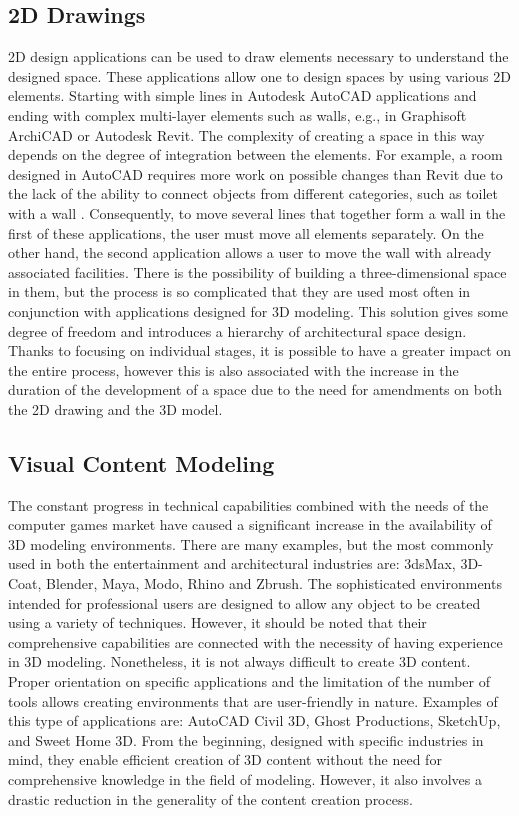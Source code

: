 \documentclass[runningheads]{llncs}
\begin{document}
\subsection{2D Drawings}
2D design applications can be used to draw elements necessary to understand the designed space. These applications allow one to design spaces by using various 2D elements. Starting with simple lines in Autodesk AutoCAD applications and ending with complex multi-layer elements such as walls, e.g., in Graphisoft ArchiCAD or Autodesk Revit. The complexity of creating a space in this way depends on the degree of integration between the elements. For example, a room designed in AutoCAD requires more work on possible changes than Revit due to the lack of the ability to connect objects from different categories, such as toilet with a wall . Consequently, to move several lines that together form a wall in the first of these applications, the user must move all elements separately. On the other hand, the second application allows a user to move the wall with already associated facilities. There is the possibility of building a three-dimensional space in them, but the process is so complicated that they are used most often in conjunction with applications designed for 3D modeling. This solution gives some degree of freedom and introduces a hierarchy of architectural space design. Thanks to focusing on individual stages, it is possible to have a greater impact on the entire process, however this is also associated with the increase in the duration of the development of a space due to the need for amendments on both the 2D drawing and the 3D model.

\subsection{Visual Content Modeling}
The constant progress in technical capabilities combined with the needs of the computer games market have caused a significant increase in the availability of 3D modeling environments. There are many examples, but the most commonly used in both the entertainment and architectural industries are: 3dsMax, 3D-Coat, Blender, Maya, Modo, Rhino and Zbrush. The sophisticated environments intended for professional users are designed to allow any object to be created using a variety of techniques. However, it should be noted that their comprehensive capabilities are connected with the necessity of having experience in 3D modeling. Nonetheless, it is not always difficult to create 3D content. Proper orientation on specific applications and the limitation of the number of tools allows creating environments that are user-friendly in nature. Examples of this type of applications are: AutoCAD Civil 3D, Ghost Productions, SketchUp, and Sweet Home 3D. From the beginning, designed with specific industries in mind, they enable efficient creation of 3D content without the need for comprehensive knowledge in the field of modeling. However, it also involves a drastic reduction in the generality of the content creation process.
\end{document}
